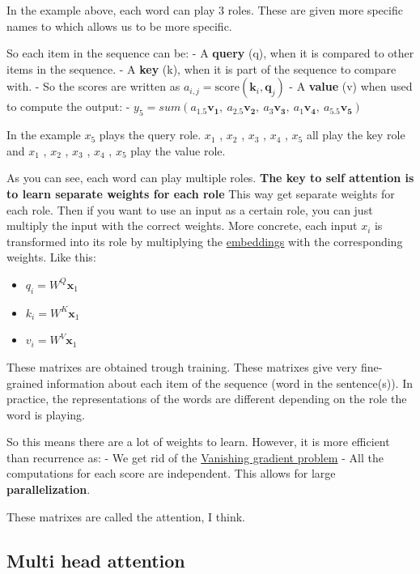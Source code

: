 \documentclass[
  11pt,
  british,
]{article}
\providecommand{\tightlist}{%
  \setlength{\itemsep}{0pt}\setlength{\parskip}{0pt}}
\begin{document}
In the example above, each word can play 3 roles. These are given more
specific names to which allows us to be more specific.

So each item in the sequence can be: - A \textbf{query} (q), when it is
compared to other items in the sequence. - A \textbf{key} (k), when it
is part of the sequence to compare with. - So the scores are written as
\(a_{i,j} = \text{score}(\mathbf{k}_{i},\mathbf{q}_{j})\) - A
\textbf{value} (v) when used to compute the output: -
\(y_{5} = sum(a_{1.5}\mathbf{v_1},~a_{2.5}\mathbf{v_{2}},~a_{3}\mathbf{v_{3}},~a_{1}\mathbf{v_{4}},~a_{5.5}\mathbf{v_{5}})\)

In the example \(x_{5}\) plays the query role. \(x_{1}\) , \(x_{2}\) ,
\(x_3\) , \(x_4\) , \(x_5\) all play the key role and \(x_{1}\) ,
\(x_{2}\) , \(x_3\) , \(x_4\) , \(x_5\) play the value role.

As you can see, each word can play multiple roles. \textbf{The key to
self attention is to learn separate weights for each role} This way get
separate weights for each role. Then if you want to use an input as a
certain role, you can just multiply the input with the correct weights.
More concrete, each input \(x_i\) is transformed into its role by
multiplying the \href{../Semantic-Similarity/Embeddings.md}{embeddings}
with the corresponding weights. Like this:

\begin{itemize}
\tightlist
\item
  \(q_{i}=W^Q\mathbf{x}_1\)
\item
  \(k_{i}=W^K\mathbf{x}_1\)
\item
  \(v_{i}=W^V\mathbf{x}_1\)
\end{itemize}

These matrixes are obtained trough training. These matrixes give very
fine-grained information about each item of the sequence (word in the
sentence(s)). In practice, the representations of the words are
different depending on the role the word is playing.

So this means there are a lot of weights to learn. However, it is more
efficient than recurrence as: - We get rid of the
\href{Vanishing\%20gradient\%20problem.md}{Vanishing gradient problem} -
All the computations for each score are independent. This allows for
large \textbf{parallelization}.

These matrixes are called the attention, I think.

\hypertarget{multi-head-attention}{%
\subsection{Multi head attention}\label{multi-head-attention}}
\end{document}
